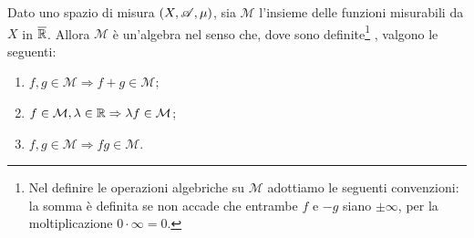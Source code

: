 \begin{proposition}\label{prop:AlgMis}
	Dato uno spazio di misura $(X,\mathscr A,\mu)$, sia $\mathcal{M}$ l'insieme delle funzioni misurabili da $X$ in $\overline{\mathbb R}$.
	Allora $\mathcal{M}$ è un'algebra nel senso che, dove sono definite\footnote{Nel definire le operazioni algebriche su $\mathcal{M}$ adottiamo le seguenti convenzioni: la somma è definita se non accade che entrambe $f$ e $-g$ siano $\pm\infty$, per la moltiplicazione $0\cdot \infty = 0$.} ,
	valgono le seguenti:
	\begin{enumerate}[label=(\arabic*),ref=(\arabic*)]
		\item $f,g\in \mathcal{M} \Rightarrow f+g\in \mathcal{M}$; \label{AlM:sum}
		\item $f\in \mathcal{M}, \lambda \in \mathbb R \Rightarrow \lambda f\in \mathcal{M}$; \label{AlM:sca}
		\item $f,g\in \mathcal{M} \Rightarrow fg\in \mathcal{M}$. \label{AlM:pro}
	\end{enumerate}
\end{proposition}

